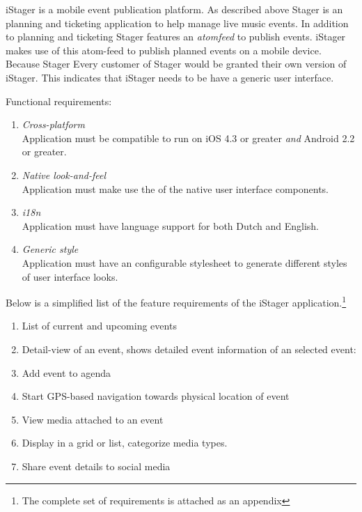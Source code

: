 iStager is a mobile event publication platform. As described above Stager is an planning and ticketing application to help manage live music events. In addition to planning and ticketing Stager features an \emph{atomfeed} to publish events. iStager makes use of this atom-feed to publish planned events on a mobile device. Because Stager
Every customer of Stager would be granted their own version of iStager. This indicates that iStager needs to be have a generic user interface.



Functional requirements:
\begin{enumerate}
\item \emph{Cross-platform}\\Application must be compatible to run on iOS 4.3 or greater \emph{and} Android 2.2 or greater.
\item \emph{Native look-and-feel}\\Application must make use the of the native user interface components.
\item \emph{i18n}\\Application must have language support for both Dutch and English.
\item \emph{Generic style}\\Application must have an configurable stylesheet to generate different styles of user interface looks.
\end{enumerate}

\noindent Below is a simplified list of the feature requirements of the iStager application.\footnote{The complete set of requirements is attached as an appendix} %
\begin{enumerate}
\item
List of current and upcoming events
\item
Detail-view of an event, shows detailed event information of an selected event:
\item
Add event to agenda
\item
Start GPS-based navigation towards physical location of event
\item
View media attached to an event
\item
Display in a grid or list, categorize media types.
\item
Share event details to social media
\end{enumerate}

